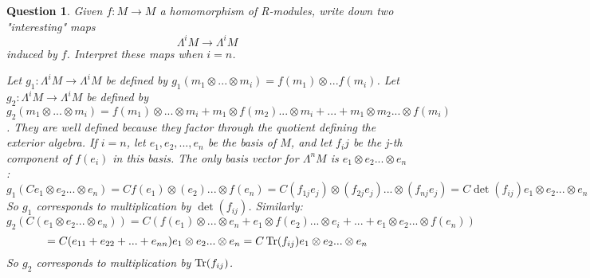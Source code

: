 \documentclass[a4paper]{article}
\newtheorem{que}[thm]{Question}
\begin{document}
\begin{que} Given $f : M \to M$ a homomorphism of R-modules, write down two "interesting" maps
$$\Lambda^i M \to \Lambda^i M$$ induced by $f$. Interpret these maps when $i=n$.

Let $g_1 : \Lambda^i M \to \Lambda^i M$ be defined by $g_1(m_1 \otimes ... \otimes m_i) = f(m_1) \otimes ... f(m_i)$. 
Let $g_2 : \Lambda^i M \to \Lambda^i M$ be defined by $g_2(m_1 \otimes ... \otimes m_i) = f(m_1) \otimes ... \otimes m_i + m_1 \otimes f(m_2) ... \otimes m_i + ... + m_1 \otimes m_2 ... \otimes f(m_i)$. They are well defined because they factor through the quotient defining the exterior algebra.
If $i=n$, let $e_1, e_2, ..., e_n$ be the basis of $M$, and let $f_ij$ be the j-th component of $f(e_i)$ in this basis. The only basis vector for $\Lambda^n M$ is $e_1 \otimes e_2 ... \otimes e_n$:
$$g_1(C e_1 \otimes e_2 ... \otimes e_n) = C f(e_1) \otimes (e_2) ... \otimes f(e_n) = C (f_{1j}e_j) \otimes (f_{2j}e_j) ... \otimes (f_{nj}e_j) = C \det(f_{ij})  e_1 \otimes e_2 ... \otimes e_n$$
So $g_1$ corresponds to multiplication by $\det(f_{ij})$.
Similarly:
$$g_2(C( e_1 \otimes e_2 ... \otimes e_n)) = C(f(e_1) \otimes ... \otimes e_n + e_1 \otimes f(e_2) ... \otimes e_i + ... + e_1 \otimes e_2 ... \otimes f(e_n))$$
$$ = C(e_{11} + e_{22}+...+e_{nn}) e_1 \otimes e_2 ... \otimes e_n = C \operatorname{Tr}(f_{ij}) e_1 \otimes e_2 ... \otimes e_n$$
So $g_2$ corresponds to multiplication by $\operatorname{Tr}(f_{ij})$.
\end{que}
\end{document}
